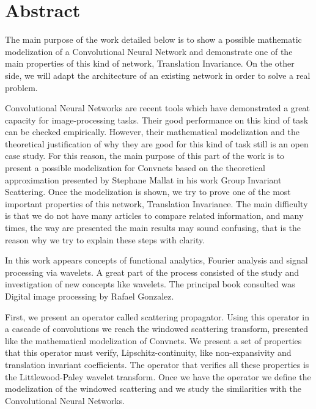 %

\chapter{Abstract}

\noindent The main purpose of the work detailed below is to show a possible mathematic modelization of a Convolutional Neural Network and demonstrate one of the main properties of this kind of network, Translation Invariance.  On the other side, we will adapt the architecture of an existing network in order to solve a real problem.

\medskip

\noindent Convolutional Neural Networks are recent tools which have demonstrated a great capacity for image-processing tasks. Their good performance on this kind of task can be checked empirically. However, their mathematical modelization and the theoretical justification of why they are good for this kind of task still is an open case study. For this reason, the main purpose of this part of the work is to present a possible modelization for Convnets based on the theoretical approximation presented by Stephane Mallat in his work Group Invariant Scattering. Once the modelization is shown, we try to prove one of the most important properties of this network, Translation Invariance. The main difficulty is that we do not have many articles to compare related information, and many times, the way are presented the main results may sound confusing, that is the reason why we try to explain these steps with clarity.

\medskip

\noindent In this work appears concepts of functional analytics, Fourier analysis and signal processing via wavelets.  A great part of the process consisted of the study and investigation of new concepts like wavelets. The principal book consulted was Digital image processing by Rafael Gonzalez.

\medskip

\noindent First, we present an operator called scattering propagator. Using this operator in a cascade of convolutions we reach the windowed scattering transform, presented like the mathematical modelization of Convnets. We present a set of properties that this operator must verify, Lipschitz-continuity, like non-expansivity and translation invariant coefficients. The operator that verifies all these properties is the Littlewood-Paley wavelet transform. Once we have the operator we define the modelization of the windowed scattering and we study the similarities with the Convolutional Neural Networks. 

